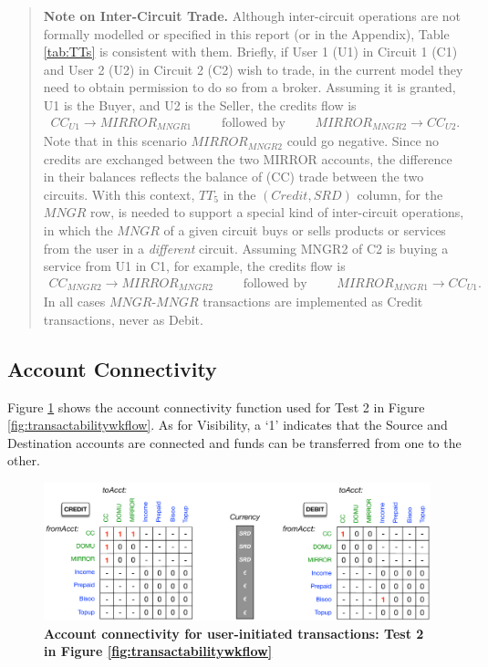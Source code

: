 \begin{quote}
\small
{\bf Note on Inter-Circuit Trade.} Although inter-circuit operations are not formally modelled or specified in this report (or in the Appendix), Table \ref{tab:TTs} is consistent with them. Briefly, if User 1 (U1) in Circuit 1 (C1) and User 2 (U2) in Circuit 2 (C2) wish to trade, in the current  model they need to obtain permission to do so from a broker. Assuming it is granted, U1 is the Buyer, and U2 is the Seller, the credits flow is
\begin{align}
CC_{U1} \rightarrow MIRROR_{MNGR1} \qquad \text{ followed by } \qquad MIRROR_{MNGR2} \rightarrow CC_{U2}. 
\end{align}
Note that in this scenario $MIRROR_{MNGR2}$ could go negative. Since no credits are exchanged between the two MIRROR accounts, the difference in their balances reflects the balance of (CC) trade between the two circuits. With this context, $TT_5$ in the $(Credit, SRD)$ column, for the $MNGR$ row, is needed to support a special kind of inter-circuit operations, in which the $MNGR$ of a given circuit buys or sells products or services from the user in a \emph{different} circuit. Assuming MNGR2 of C2 is buying a service from U1 in C1, for example, the credits flow is
\begin{align}
CC_{MNGR2} \rightarrow MIRROR_{MNGR2}\qquad \text{ followed by } \qquad MIRROR_{MNGR1} \rightarrow CC_{U1}.
\end{align}
In all cases $MNGR$-$MNGR$ transactions are implemented as Credit transactions, never as Debit.
\end{quote}



\subsection{Account Connectivity}
\label{subsec:perm-acc-con}
Figure \ref{fig:User_Acct_Connectivity} shows the account connectivity function used for Test 2 in Figure \ref{fig:transactabilitywkflow}. As for Visibility, a `1' indicates that the Source and Destination accounts are connected and funds can be transferred from one to the other.

\newpage

\begin{figure}[h]
\vspace{-0.5cm}
\centering
\includegraphics[width=15cm]{Figures/User_Acct_Connectivity}
\caption{\small\textbf{Account connectivity for user-initiated transactions: Test 2 in Figure \ref{fig:transactabilitywkflow}}}
\label{fig:User_Acct_Connectivity}
\vspace{-0.5cm}
\end{figure}

